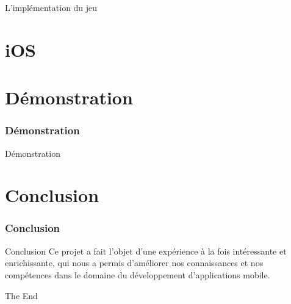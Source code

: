 \documentclass{beamer}
\begin{document}
\begin{frame}
\begin{block}{L'implémentation du jeu}

\end{block}
   
\end{frame}



\section{iOS}



\section{Démonstration}

\begin{frame}
\frametitle{Démonstration}
	\Huge{\centerline{Démonstration}}
\end{frame}

\section{Conclusion}


\begin{frame}
\frametitle{Conclusion}
	\begin{block}{Conclusion}
	Ce projet a fait l'objet d'une expérience à  la fois intéressante et enrichissante, qui nous a permis d'améliorer nos connaissances et nos compétences dans le domaine du développement d'applications mobile.
	\end{block}
\end{frame}

\begin{frame}
\Huge{\centerline{The End}}
\end{frame}

\end{document}
